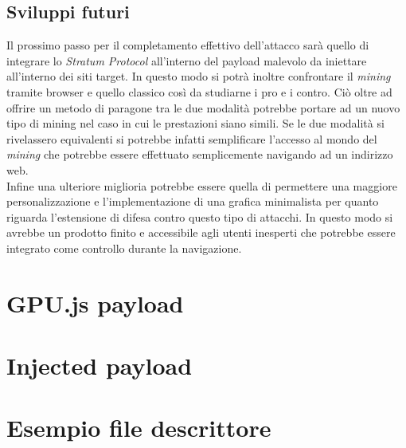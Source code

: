 \documentclass[conference, italian]{IEEEtran}
\begin{document}
\subsection{Sviluppi futuri}\label{sec:future-works}
Il prossimo passo per il completamento effettivo dell'attacco sarà quello di integrare lo \emph{Stratum Protocol} all'interno del payload malevolo da iniettare all'interno dei siti target. In questo modo si potrà inoltre confrontare il \emph{mining} tramite browser e quello classico così da studiarne i pro e i contro. Ciò oltre ad offrire un metodo di paragone tra le due modalità potrebbe portare ad un nuovo tipo di mining nel caso in cui le prestazioni siano simili. Se le due modalità si rivelassero equivalenti si potrebbe infatti semplificare l'accesso al mondo del \emph{mining} che potrebbe essere effettuato semplicemente navigando ad un indirizzo web.\\
Infine una ulteriore miglioria potrebbe essere quella di permettere una maggiore personalizzazione e l'implementazione di una grafica minimalista per quanto riguarda l'estensione di difesa contro questo tipo di attacchi. In questo modo si avrebbe un prodotto finito e accessibile agli utenti inesperti che potrebbe essere integrato come controllo durante la navigazione.

\balance
\newpage
\printbibliography
\vspace{12pt}


\onecolumn
\begin{appendices}
\appendix
  \section*{GPU.js payload}\label{appendix:gpu-payload}
  

  \section*{Injected payload}\label{appendix:injected-payload}
  

  \section*{Esempio file descrittore}\label{appendix:descriptor-file}
  
\end{appendices}
\end{document}
